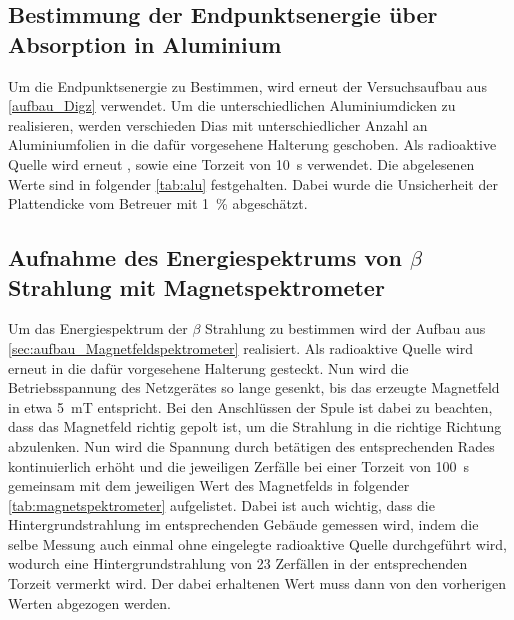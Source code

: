 \documentclass[12pt,english,ngerman]{scrartcl}
\begin{document}
\subsection{Bestimmung der Endpunktsenergie über Absorption in Aluminium}

Um die Endpunktsenergie zu Bestimmen, wird erneut der Versuchsaufbau aus
\autoref{aufbau_Digz} verwendet. Um die unterschiedlichen Aluminiumdicken zu
realisieren, werden verschieden Dias mit unterschiedlicher Anzahl an
Aluminiumfolien in die dafür vorgesehene Halterung geschoben. Als radioaktive
Quelle wird erneut , sowie eine Torzeit von \SI{10}{\second}
verwendet. Die abgelesenen Werte sind in folgender \autoref{tab:alu}
festgehalten. Dabei wurde die Unsicherheit der Plattendicke vom Betreuer mit
\SI{1}{\percent} abgeschätzt.

\begin{table}[H]
	\caption[Erhaltene Zählraten bei $\beta$-Strahlung bei verschiedenen Dicken] {
		Erhaltene
		Zählraten bei $\beta$-Strahlung bei verschiedenen Dicken einer Aluminiumplatte
		bei einer Torzeit von \SI{10}{\second}. Dabei sind die Zählraten exakte Werte.                   \\
		\(D \dots\) Dicke der Aluminiumabschirmung in $\mu$m mit einer Unsicherheit von \SI{1}{\percent} \\
		\(z_{i} \dots\) erhaltene Zählrate bei entsprechendem Abstand
	}
	\label{tab:alu}
	\begin{center}
		
	\end{center}
\end{table}

\subsection{Aufnahme des Energiespektrums von \texorpdfstring{$\beta$}{beta} Strahlung mit Magnetspektrometer}

Um das Energiespektrum der \(\beta\) Strahlung zu bestimmen wird der Aufbau aus
\autoref{sec:aufbau_Magnetfeldspektrometer} realisiert. Als radioaktive Quelle
wird erneut  in die dafür vorgesehene Halterung gesteckt. Nun
wird die Betriebsspannung des Netzgerätes so lange gesenkt, bis das erzeugte
Magnetfeld in etwa \SI{5}{\milli\tesla} entspricht. Bei den Anschlüssen der
Spule ist dabei zu beachten, dass das Magnetfeld richtig gepolt ist, um die
Strahlung in die richtige Richtung abzulenken. Nun wird die Spannung durch
betätigen des entsprechenden Rades kontinuierlich erhöht und die jeweiligen
Zerfälle bei einer Torzeit von \SI{100}{\second} gemeinsam mit dem jeweiligen
Wert des Magnetfelds in folgender \autoref{tab:magnetspektrometer} aufgelistet.
Dabei ist auch wichtig, dass die Hintergrundstrahlung im entsprechenden Gebäude
gemessen wird, indem die selbe Messung auch einmal ohne eingelegte radioaktive
Quelle durchgeführt wird, wodurch eine Hintergrundstrahlung von 23 Zerfällen in
der entsprechenden Torzeit vermerkt wird. Der dabei erhaltenen Wert muss dann
von den vorherigen Werten abgezogen werden.
\end{document}
